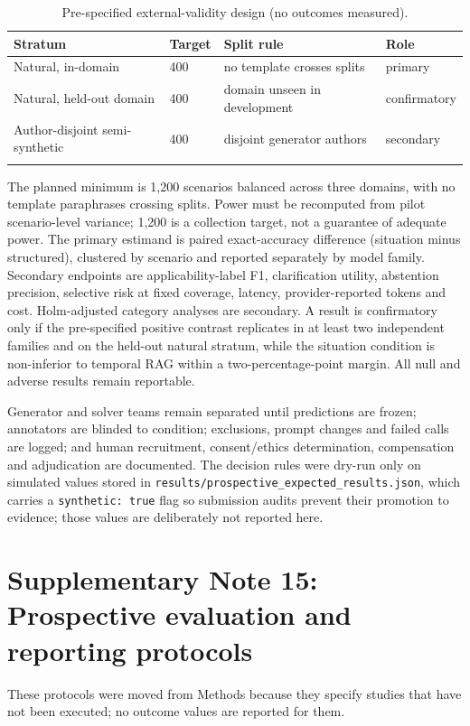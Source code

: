 \documentclass[Numbered]{sn-jnl}
\begin{document}
\begin{table}[!ht]
\centering
\caption{Pre-specified external-validity design (no outcomes measured).}
\begin{tabular}{llll}
\toprule
Stratum & Target & Split rule & Role \\
\midrule
Natural, in-domain & 400 & no template crosses splits & primary \\
Natural, held-out domain & 400 & domain unseen in development & confirmatory \\
Author-disjoint semi-synthetic & 400 & disjoint generator authors & secondary \\
\botrule
\end{tabular}
\end{table}

The planned minimum is 1,200 scenarios balanced across three domains, with no
template paraphrases crossing splits. Power must be recomputed from pilot
scenario-level variance; 1,200 is a collection target, not a guarantee of
adequate power. The primary estimand is paired exact-accuracy difference
(situation minus structured), clustered by scenario and reported separately by
model family. Secondary endpoints are applicability-label F1, clarification
utility, abstention precision, selective risk at fixed coverage, latency,
provider-reported tokens and cost. Holm-adjusted category analyses are
secondary. A result is confirmatory only if the pre-specified positive contrast
replicates in at least two independent families and on the held-out natural
stratum, while the situation condition is non-inferior to temporal RAG within a
two-percentage-point margin. All null and adverse results remain reportable.

Generator and solver teams remain separated until predictions are frozen;
annotators are blinded to condition; exclusions, prompt changes and failed
calls are logged; and human recruitment, consent/ethics determination,
compensation and adjudication are documented. The decision rules were dry-run only on simulated values stored in
\texttt{results/prospective\_expected\_results.json}, which carries a
\texttt{synthetic: true} flag so submission audits prevent their promotion to
evidence; those values are deliberately not reported here.

\section*{Supplementary Note 15: Prospective evaluation and reporting protocols}
These protocols were moved from Methods because they specify studies that have not
been executed; no outcome values are reported for them.
\end{document}
